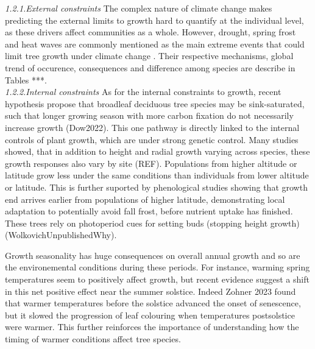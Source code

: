 \documentclass{article}
\begin{document}
\textit{1.2.1.External constraints}
The complex nature of climate change makes predicting the external limits to growth hard to quantify at the individual level, as these drivers affect communities as a whole. However, drought, spring frost and heat waves are commonly mentioned as the main extreme events that could limit tree growth under climate change \cite{tyree_xylem_2002, choat_triggers_2018, li_widespread_2023,trenberth_global_2014,intergovernmental_panel_on_climate_change_detection_2014,chiang_evidence_2021,polgar_leafout_2011,reinmann_compensatory_2023}. Their respective mechanisms, global trend of occurence, consequences and difference among species are describe in Tables ***. \\

\textit{1.2.2.Internal constraints}
As for the internal constraints to growth, recent hypothesis propose that broadleaf deciduous tree species may be sink-saturated, such that longer growing season with more carbon fixation do not necessarily increase growth (Dow2022). This one pathway is directly linked to the internal controls of plant growth, which are under strong genetic control. Many studies showed, that in addition to height and radial growth varying across species, these growth responses also vary by site (REF). Populations from higher altitude or latitude grow less under the same conditions than individuals from lower altitude or latitude. This is further suported by phenological studies showing that growth end arrives earlier from populations of higher latitude, demonstrating local adaptation to potentially avoid fall frost, before nutrient uptake has finished. These trees rely on photoperiod cues for setting buds (stopping height growth) (WolkovichUnpublishedWhy). 

Growth seasonality has huge consequences on overall annual growth and so are the environemental conditions during these periods. For instance, warming spring temperatures seem to positively affect growth, but recent evidence suggest a shift in this net positive effect near the summer solstice. Indeed Zohner 2023 found that warmer temperatures before the solstice advanced the onset of senescence, but it slowed the progression of leaf colouring when temperatures postsolstice were warmer. This further reinforces the importance of understanding how the timing of warmer conditions affect tree species. \\ %
\end{document}
